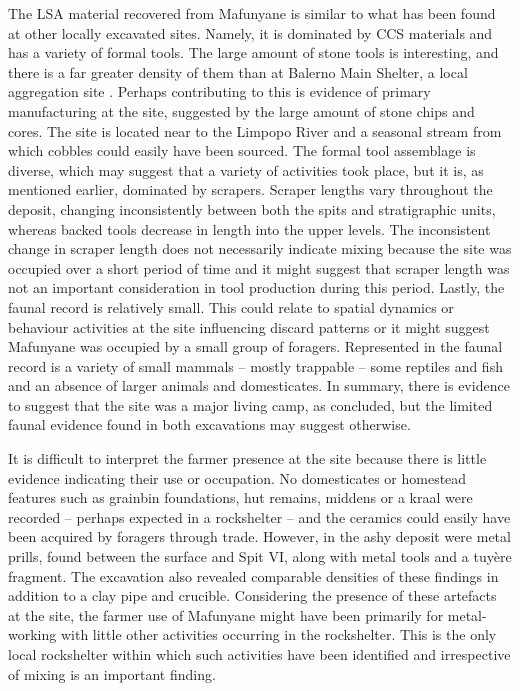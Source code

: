 The LSA material recovered from Mafunyane is similar to what has been found at other locally excavated sites. Namely, it is dominated by CCS materials and has a variety of formal tools. The large amount of stone tools is interesting, and there is a far greater density of them than at Balerno Main Shelter, 
a local aggregation site \parencite{vanDoornum_2008}. Perhaps contributing to this is evidence of primary manufacturing at the site, suggested by the large amount of stone chips and cores. The site is located near to the Limpopo River and a seasonal stream from which cobbles could easily have been sourced. The formal tool assemblage is diverse, 
which may suggest that a variety of activities took place, but it is, as mentioned earlier, dominated by scrapers. Scraper lengths vary throughout the deposit, changing inconsistently between both the spits and stratigraphic units, whereas backed tools decrease in length into the upper levels. The inconsistent change in scraper length does not necessarily indicate mixing because the site was occupied over a short period of time and it might suggest that scraper length was not an important consideration in tool production during this period. Lastly, 
the faunal record is relatively small. This could relate to spatial dynamics or behaviour activities at the site influencing discard patterns or it might suggest Mafunyane was occupied by a small group of foragers. Represented in the faunal record is a variety of small mammals – mostly trappable – some reptiles and fish and an absence of larger animals and domesticates. In summary, there is evidence to suggest that the site was a major living camp, as \textcite{Walker_1994} concluded, but the limited faunal evidence found in both excavations may suggest otherwise.

It is difficult to interpret the farmer presence at the site because there is little evidence indicating their use or occupation. No domesticates or homestead features such as grainbin foundations, hut remains, middens or a kraal were recorded – perhaps expected in a rockshelter – and the ceramics could easily have been acquired by foragers through trade. However, in the ashy deposit were metal prills, found between the surface and Spit VI, along with metal tools and a tuyère fragment. The \textcite{Walker_1994} excavation also revealed comparable densities of these findings in addition to a clay pipe and crucible. Considering the presence of these artefacts at the site, the farmer use of Mafunyane might have been primarily for metal-working with little other activities occurring in the rockshelter. This is the only local rockshelter within which such activities have been identified and irrespective of mixing is an important finding.

